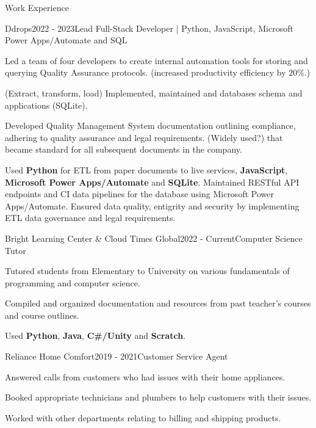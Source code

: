 \documentclass{resume}
\begin{document}
    \begin{rSection}{Work Experience}
        \begin{rSubsection}{Ddrops}{2022 - 2023}{Lead Full-Stack Developer   |    {Python}, {JavaScript}, {Microsoft Power Apps/Automate} and {SQL}}{}
            \item Led a team of four developers to create internal automation tools for storing and querying Quality Assurance protocols. (increased productivity efficiency by 20\%.)
            \item (Extract, transform, load) Implemented, maintained and databases schema and applications (SQLite).
            \item Developed Quality Management System documentation outlining compliance, adhering to quality assurance and legal requirements. (Widely used?) that became standard for all subsequent documents in the company.
            \item Used \textbf{Python} for ETL from paper documents to live services, \textbf{JavaScript}, \textbf{Microsoft Power Apps/Automate} and \textbf{SQLite}.
            Maintained RESTful API endpoints and CI data pipelines for the database using Microsoft Power Apps/Automate. Ensured data quality, entigrity and security by implementing ETL data governance and legal requirements. 
        \end{rSubsection}
    
        \begin{rSubsection}{Bright Learning Center \& Cloud Times Global}{2022 - Current}{Computer Science Tutor}{}
            \item Tutored students from Elementary to University on various fundamentals of programming and computer science.
            \item Compiled and organized documentation and resources from past teacher's courses and course outlines.
            \item Used \textbf{Python}, \textbf{Java}, \textbf{C\#/Unity} and \textbf{Scratch}.
        \end{rSubsection}
    
        \begin{rSubsection}{Reliance Home Comfort}{2019 - 2021}{Customer Service Agent}{}
            \item Answered calls from customers who had issues with their home appliances.
            \item Booked appropriate technicians and plumbers to help customers with their issues.
            \item Worked with other departments relating to billing and shipping products.
        \end{rSubsection}
    

\end{rSection}
\end{document}
